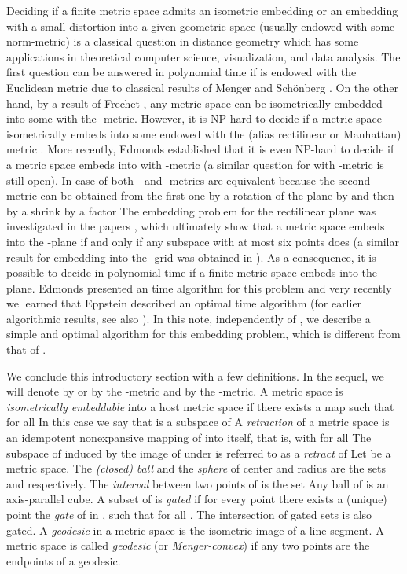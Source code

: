 \documentclass[11pt]{amsart}
\begin{document}
Deciding if a finite metric space  admits an isometric embedding or an embedding with a small distortion
into a given geometric space (usually  endowed with some norm-metric) is a classical question
in distance geometry  which has some applications in theoretical computer science, visualization, and data analysis.
The first question can be answered in polynomial time
if  is endowed with the Euclidean metric due to classical results of Menger and Sch\"onberg \cite{DeLa}.
On the other hand, by a result of Frechet \cite{DeLa}, any metric space can be isometrically embedded into some
 with the -metric. However, it is NP-hard  to decide if a metric space isometrically
embeds into some  endowed with the  (alias rectilinear or Manhattan) metric \cite{AvDe,DeLa}. More recently,
Edmonds \cite{Ed} established that it is even NP-hard to decide if a metric space embeds into  with
-metric (a similar question for  with
-metric is still open).  In case of  both - and -metrics are equivalent because the
second metric can be obtained from the first one by a rotation of the plane by   and then by a shrink by a factor
 The embedding problem for the rectilinear plane was investigated in the papers \cite{BaCh_six,MaMa}, which ultimately
show that a metric space  embeds into the -plane if and only if any subspace
with at most six points does \cite{BaCh_six}  (a similar result for embedding into the -grid was obtained in \cite{BaCh_grid}).
As a consequence, it is possible to decide in polynomial time if a finite metric space embeds into the -plane.
Edmonds \cite{Ed} presented an  time algorithm for this problem and very recently we learned that
Eppstein \cite{Epp} described an optimal  time algorithm (for earlier algorithmic results, see also \cite{ChTr}).
In this note, independently of \cite{Epp}, we describe a simple and optimal algorithm for this embedding problem,
which is different from that of \cite{Epp}.

We conclude this introductory section with a few definitions. In the
sequel, we will denote by  or by  the -metric
and by  the -metric. A metric space 
is {\it isometrically embeddable} into a host metric space 
if there exists a map  such that
 for all  In this case
we say that   is a subspace of  A {\it retraction} 
of  a metric space  is an idempotent nonexpansive mapping of
 into itself, that is,  with
 for all  The
subspace  of  induced by the image of  under  is
referred to as a {\it retract} of  Let  be a metric
space.  The {\it (closed) ball} and the {\it sphere} of center 
and radius  are the sets  and
 respectively. The \emph{interval}
between two points  of  is the set   Any ball of 
is an axis-parallel cube. A subset  of  is \emph{gated} if for
every point  there exists a (unique) point  the
\emph{gate} of  in ,  such that  for all  \cite{DrSch}. The intersection of gated sets is also gated.  A
{\it geodesic} in a metric space is the isometric image of a line
segment. A metric space is called {\it geodesic} (or {\it
Menger-convex}) if any two points are the endpoints of a geodesic.
\end{document}
